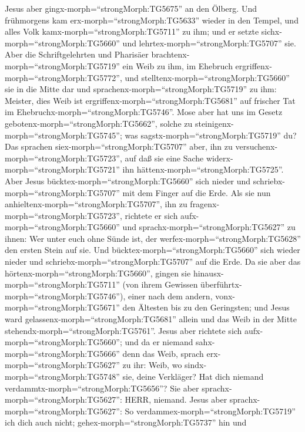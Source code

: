  Jesus aber gingx-morph=``strongMorph:TG5675'' an den
Ölberg.  Und frühmorgens kam
erx-morph=``strongMorph:TG5633'' wieder in den Tempel, und alles Volk
kamx-morph=``strongMorph:TG5711'' zu ihm; und er setzte
sichx-morph=``strongMorph:TG5660'' und
lehrtex-morph=``strongMorph:TG5707'' sie.  Aber die
Schriftgelehrten und Pharisäer brachtenx-morph=``strongMorph:TG5719''
ein Weib zu ihm, im Ehebruch ergriffenx-morph=``strongMorph:TG5772'',
und stelltenx-morph=``strongMorph:TG5660'' sie in die Mitte dar
 und sprachenx-morph=``strongMorph:TG5719'' zu ihm: Meister,
dies Weib ist ergriffenx-morph=``strongMorph:TG5681'' auf frischer Tat
im Ehebruchx-morph=``strongMorph:TG5746''.  Mose aber hat
uns im Gesetz gebotenx-morph=``strongMorph:TG5662'', solche zu
steinigenx-morph=``strongMorph:TG5745''; was
sagstx-morph=``strongMorph:TG5719'' du?  Das sprachen
siex-morph=``strongMorph:TG5707'' aber, ihn zu
versuchenx-morph=``strongMorph:TG5723'', auf daß sie eine Sache
widerx-morph=``strongMorph:TG5721'' ihn
hättenx-morph=``strongMorph:TG5725''. Aber Jesus
bücktex-morph=``strongMorph:TG5660'' sich nieder und
schriebx-morph=``strongMorph:TG5707'' mit dem Finger auf die Erde.
 Als sie nun anhieltenx-morph=``strongMorph:TG5707'', ihn zu
fragenx-morph=``strongMorph:TG5723'', richtete er sich
aufx-morph=``strongMorph:TG5660'' und
sprachx-morph=``strongMorph:TG5627'' zu ihnen: Wer unter euch ohne Sünde
ist, der werfex-morph=``strongMorph:TG5628'' den ersten Stein auf sie.
 Und bücktex-morph=``strongMorph:TG5660'' sich wieder nieder
und schriebx-morph=``strongMorph:TG5707'' auf die Erde.  Da
sie aber das hörtenx-morph=``strongMorph:TG5660'', gingen sie
hinausx-morph=``strongMorph:TG5711'' (von ihrem Gewissen
überführtx-morph=``strongMorph:TG5746''), einer nach dem andern,
vonx-morph=``strongMorph:TG5671'' den Ältesten bis zu den Geringsten;
und Jesus ward gelassenx-morph=``strongMorph:TG5681'' allein und das
Weib in der Mitte stehendx-morph=``strongMorph:TG5761''. 
Jesus aber richtete sich aufx-morph=``strongMorph:TG5660''; und da er
niemand sahx-morph=``strongMorph:TG5666'' denn das Weib, sprach
erx-morph=``strongMorph:TG5627'' zu ihr: Weib, wo
sindx-morph=``strongMorph:TG5748'' sie, deine Verkläger? Hat dich
niemand verdammtx-morph=``strongMorph:TG5656''?  Sie aber
sprachx-morph=``strongMorph:TG5627'': HERR, niemand. Jesus aber
sprachx-morph=``strongMorph:TG5627'': So
verdammex-morph=``strongMorph:TG5719'' ich dich auch nicht;
gehex-morph=``strongMorph:TG5737'' hin und
